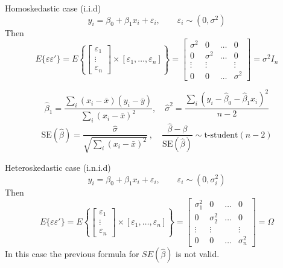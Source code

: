 \documentclass{beamer}
\begin{document}
\begin{frame}{Homoskedastic case (i.i.d)}
\[ y_i=\beta_0+\beta_1x_i+\varepsilon_i,\qquad \varepsilon_i\sim (0,\sigma^2) \]
Then \[E\{\varepsilon\varepsilon'\}=E\left\{ \left[\begin{array}{c}
\varepsilon_1 \\
\vdots \\
\varepsilon_n
\end{array} \right] \times [\varepsilon_1,  \dots , \varepsilon_n]\right\}= \left[\begin{array}{cccc}
\sigma^2 & 0& \dots & 0\\
0 & \sigma^2 &\dots& 0\\
\vdots & \vdots & &\vdots \\
0&0 &\dots&\sigma^2
\end{array} \right]=\sigma^2I_n\]

\[\hat{\beta}_1=\frac{\sum_i (x_i-\bar{x})(y_i-\bar{y})}{\sum_i(x_i-\bar{x})^2} , \quad\hat{\sigma}^2=\frac{\sum_i(y_i-\hat{\beta}_0-\hat{\beta}_1{x}_i)^2}{n-2} \]
\[ \text{SE}(\hat{\beta})=\frac{\hat{\sigma}}{\sqrt{\sum_i(x_i-\bar{x})^2}} \ , \quad  \frac{\hat{\beta}-\beta}{\text{SE}(\hat{\beta})}\sim \text{t-student}(n-2) \]
\end{frame}

\begin{frame}{Heteroskedastic case (i.n.i.d)}
\[ y_i=\beta_0+\beta_1x_i+\varepsilon_i,\qquad \varepsilon_i\sim (0,\sigma^2_i) \]
Then \[E\{\varepsilon\varepsilon'\}=E\left\{ \left[\begin{array}{c}
\varepsilon_1 \\
\vdots \\
\varepsilon_n
\end{array} \right] \times [\varepsilon_1,  \dots , \varepsilon_n]\right\}= \left[\begin{array}{cccc}
\sigma^2_1 & 0& \dots & 0\\
0 & \sigma^2_2 &\dots& 0\\
\vdots & \vdots & &\vdots \\
0&0 &\dots&\sigma^2_n
\end{array} \right]=\Omega \]
In this case the previous formula for $SE(\hat{\beta})$ is not valid.
\end{frame}
\end{document}

